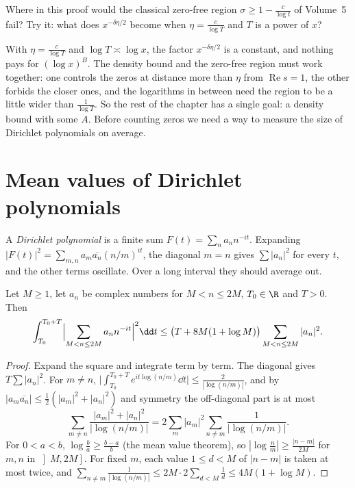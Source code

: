 \begin{think}
Where in this proof would the classical zero-free region $\sigma\ge1-\frac c{\log t}$ of Volume~5 fail? Try it: what does $x^{-\delta\eta/2}$ become when $\eta=\frac c{\log T}$ and $T$ is a power of $x$?
\end{think}

With $\eta=\frac c{\log T}$ and $\log T\asymp\log x$, the factor $x^{-\delta\eta/2}$ is a constant, and nothing pays for $(\log x)^B$. The density bound and the zero-free region must work together: one controls the zeros at distance more than $\eta$ from $\operatorname{Re}s=1$, the other forbids the closer ones, and the logarithms in between need the
region to be a little wider than $\frac1{\log T}$. So the rest of the chapter has a single goal: a density bound with some $A$. Before counting zeros we need a way to measure the size of Dirichlet polynomials on average.

\section{Mean values of Dirichlet polynomials}

A \emph{Dirichlet polynomial} is a finite sum $F(t)=\sum_na_nn^{-it}$. Expanding $|F(t)|^2=\sum_{m,n}a_m\overline{a_n}(n/m)^{it}$, the diagonal $m=n$ gives $\sum|a_n|^2$ for every $t$, and the other terms oscillate. Over a long interval they should average out.

\begin{lemma}\label{lem:mvt}
Let $M\ge1$, let $a_n$ be complex numbers for $M<n\le2M$, $T_0\in\R$ and $T>0$. Then
\[
\int_{T_0}^{T_0+T}\Bigl|\sum_{M<n\le2M}a_nn^{-it}\Bigr|^2\dd t\le\bigl(T+8M(1+\log M)\bigr)\sum_{M<n\le2M}|a_n|^2.
\]
\end{lemma}
\begin{proof}
Expand the square and integrate term by term. The diagonal gives $T\sum|a_n|^2$. For $m\ne n$, $\bigl|\int_{T_0}^{T_0+T}e^{it\log(n/m)}\dd t\bigr|\le\frac2{|\log(n/m)|}$, and by $|a_m\overline{a_n}|\le\frac12(|a_m|^2+|a_n|^2)$ and symmetry the off-diagonal part is at most
\[
\sum_{m\ne n}\frac{|a_m|^2+|a_n|^2}{|\log(n/m)|}=2\sum_m|a_m|^2\sum_{n\ne m}\frac1{|\log(n/m)|}.
\]
For $0<a<b$, $\log\frac ba\ge\frac{b-a}b$ (the mean value theorem), so $|\log\frac nm|\ge\frac{|n-m|}{2M}$ for $m,n$ in $\left]M,2M\right]$. For fixed $m$, each value $1\le d<M$ of $|n-m|$ is taken at most twice, and $\sum_{n\ne m}\frac1{|\log(n/m)|}\le2M\cdot2\sum_{d<M}\frac1d\le4M(1+\log M)$.
\end{proof}

